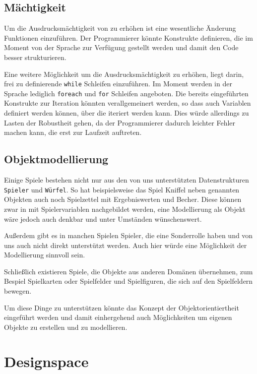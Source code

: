 	\subsection{Mächtigkeit}
	\label{sub:machtigkeit}
		Um die Ausdrucksmächtigkeit von \dg zu erhöhen ist eine wesentliche Änderung Funktionen einzuführen. Der Programmierer könnte Konstrukte definieren, die im Moment von der Sprache zur Verfügung gestellt werden und damit den Code besser strukturieren. 

		Eine weitere Möglichkeit um die Ausdrucksmächtigkeit zu erhöhen, liegt darin, frei zu definierende \texttt{while} Schleifen einzuführen. Im Moment werden in der Sprache lediglich \texttt{foreach} und \texttt{for} Schleifen angeboten. Die bereits eingeführten Konstrukte zur Iteration könnten verallgemeinert werden, so dass auch Variablen definiert werden können, über die iteriert werden kann. Dies würde allerdings zu Lasten der Robustheit gehen, da der Programmierer dadurch leichter Fehler machen kann, die erst zur Laufzeit auftreten.

	\subsection{Objektmodellierung}
	\label{sub:objektmodellierung}
		Einige Spiele bestehen nicht nur aus den von uns unterstützten Datenstrukturen \texttt{Spieler} und \texttt{Würfel}. So hat beispielsweise das Spiel Kniffel neben genannten Objekten auch noch Spielzettel mit Ergebniswerten und Becher. Diese können zwar in \dg mit Spielervariablen nachgebildet werden, eine Modellierung als Objekt wäre jedoch auch denkbar und unter Umständen wünschenswert.

		Außerdem gibt es in manchen Spielen Spieler, die eine Sonderrolle haben und von uns auch nicht direkt unterstützt werden. Auch hier würde eine Möglichkeit der Modellierung sinnvoll sein.

		Schließlich existieren Spiele, die Objekte aus anderen Domänen übernehmen, zum Bespiel Spielkarten oder Spielfelder und Spielfiguren, die sich auf den Spielfeldern bewegen.

		Um diese Dinge zu unterstützen könnte das Konzept der Objektorientiertheit eingeführt werden und damit einhergehend auch Möglichkeiten um eigenen Objekte zu erstellen und zu modellieren.

\section{Designspace}
\label{sec:designspace}

